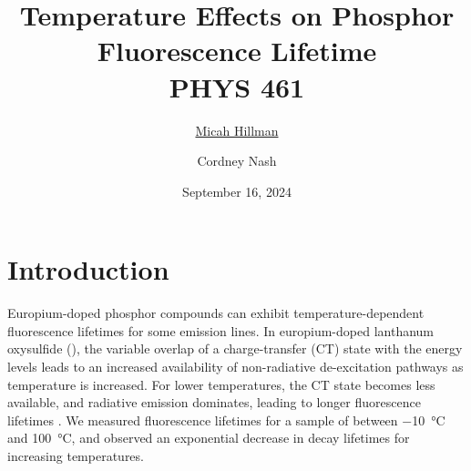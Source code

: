 \documentclass[12pt]{report}
\title{Temperature Effects on Phosphor Fluorescence Lifetime \\\vspace{0.5cm}
\large{PHYS 461}}
\date{September 16, 2024}
\author{\ul{Micah Hillman} \and Cordney Nash}
\begin{document}
  \maketitle

  \section*{Introduction}{
    Europium-doped phosphor compounds can exhibit temperature-dependent fluorescence lifetimes for some emission lines. In europium-doped lanthanum oxysulfide (), the variable overlap of a charge-transfer (CT) state with the  energy levels leads to an increased availability of non-radiative de-excitation pathways as temperature is increased. For lower temperatures, the CT state becomes less available, and radiative emission dominates, leading to longer fluorescence lifetimes \cite{parks}. We measured fluorescence lifetimes for a sample of  between \SI{-10}{\degreeCelsius} and \SI{100}{\degreeCelsius}, and observed an exponential decrease in decay lifetimes for increasing temperatures.
  }
\end{document}
